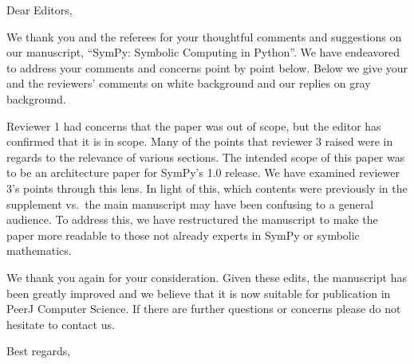 \documentclass{letter}
\date{September 31, 2016} %
\begin{document}
\begin{letter}{}
\opening{Dear Editors,}

We thank you and the referees for your thoughtful comments and suggestions on
our manuscript, ``SymPy: Symbolic Computing in Python''. We have endeavored to
address your comments and concerns point by point below. Below we give your
and the reviewers' comments on white background and our replies on gray
background.

Reviewer 1 had concerns that the paper was out of scope, but the editor has
confirmed that it is in scope. Many of the points that reviewer 3 raised were
in regards to the relevance of various sections. The intended scope of this
paper was to be an architecture paper for SymPy's 1.0 release. We have
examined reviewer 3's points through this lens. In light of this, which
contents were previously in the supplement vs.\ the main manuscript may have
been confusing to a general audience. To address this, we have restructured
the manuscript to make the paper more readable to those not already experts in
SymPy or symbolic mathematics.

We thank you again for your consideration. Given these edits, the manuscript
has been greatly improved and we believe that it is now suitable for
publication in PeerJ Computer Science. If there are further questions or
concerns please do not hesitate to contact us.

\closing{Best regards,\\
 \\
}

\end{letter}
\end{document}

